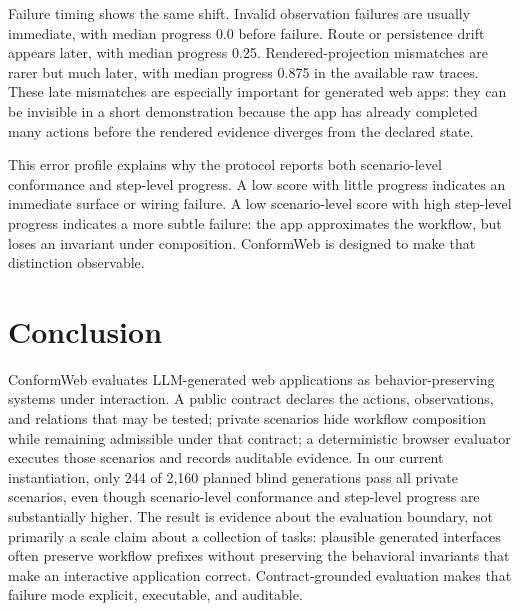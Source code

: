 Failure timing shows the same shift. Invalid observation failures are usually
immediate, with median progress 0.0 before failure. Route or persistence drift
appears later, with median progress 0.25. Rendered-projection mismatches are
rarer but much later, with median progress 0.875 in the available raw traces.
These late mismatches are especially important for generated web apps: they
can be invisible in a short demonstration because the app has already completed
many actions before the rendered evidence diverges from the declared state.

This error profile explains why the protocol reports both scenario-level
conformance and step-level progress. A low score with little progress indicates
an immediate surface or wiring failure. A low scenario-level score with high
step-level progress indicates a more subtle failure: the app approximates the
workflow, but loses an invariant under composition. ConformWeb is designed to
make that distinction observable.

\section{Conclusion}
\label{sec:conclusion}

ConformWeb evaluates LLM-generated web applications as behavior-preserving
systems under interaction. A public contract declares the actions,
observations, and relations that may be tested; private scenarios hide workflow
composition while remaining admissible under that contract; a deterministic
browser evaluator executes those scenarios and records auditable evidence. In
our current instantiation, only 244 of 2,160 planned blind generations pass
all private scenarios, even though scenario-level conformance and step-level
progress are substantially higher. The result is evidence about the evaluation
boundary, not primarily a scale claim about a collection of tasks: plausible
generated interfaces often preserve workflow prefixes without preserving the
behavioral invariants that make an interactive application correct.
Contract-grounded evaluation makes that failure mode explicit, executable, and
auditable.
